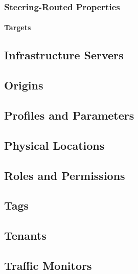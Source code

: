 \subsubsection{Steering-Routed Properties}

\paragraph{Targets}



\subsection{Infrastructure Servers}



\subsection{Origins}



\subsection{Profiles and Parameters}



\subsection{Physical Locations}



\subsection{Roles and Permissions\label{sec:roles-and-perms}}



\subsection{Tags}



\subsection{Tenants}



\subsection{Traffic Monitors}




